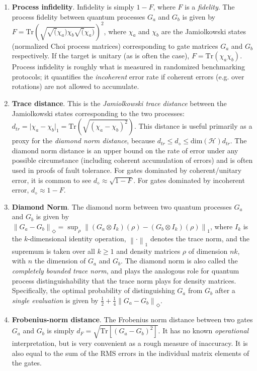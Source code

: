 \documentclass{article}[11pt]
\newcommand{\norm}[1]{\left\lVert#1\right\rVert}
\newcommand{\Tr}[0]{\mathrm{Tr}}
\begin{document}
\begin{enumerate}
\item \textbf{Process infidelity}.  Infidelity is simply $1-F$, where $F$ is a \emph{fidelity}.  The process fidelity between quantum processes $G_a$ and $G_b$ is given by $F = \Tr\left( \sqrt{ \sqrt(\chi_a) \chi_b \sqrt(\chi_a) } \right)^2$, where $\chi_a$ and $\chi_b$ are the Jamiolkowski states (normalized Choi process matrices) corresponding to gate matrices $G_a$ and $G_b$ respectively.  If the target is unitary (as is often the case), $F = \Tr\left( \chi_a \chi_b \right)$.  Process infidelity is roughly what is measured in randomized benchmarking protocols; it quantifies the \emph{incoherent} error rate if coherent errors (e.g. over rotations) are not allowed to accumulate.
\item \textbf{Trace distance}.  This is the \emph{Jamiolkowski trace distance} between the Jamiolkowski states corresponding to the two processes:  $d_{tr} = \vert\chi_a - \chi_b\vert_1 = \Tr\left(\sqrt{(\chi_a-\chi_b)^2}\right)$.  This distance is useful primarily as a proxy for the \emph{diamond norm distance}, because $d_{tr} \leq d_{\diamond} \leq \mathrm{dim}(\mathcal{H}) d_{tr}$.  The diamond norm distance is an upper bound on the rate of error under any possible circumstance (including coherent accumulation of errors) and is often used in proofs of fault tolerance.  For gates dominated by coherent/unitary error, it is common to see $d_{\diamond} \approx \sqrt{1-F}$.  For gates dominated by incoherent error, $d_{\diamond} \approx 1-F$.
\item \textbf{Diamond Norm}.  The diamond norm between two quantum processes $G_a$ and $G_b$ is given by $\norm{G_a - G_b}_\Diamond = \sup_\rho \norm{(G_a \otimes I_k)(\rho) - (G_b \otimes I_k)(\rho)}_1$, where $I_k$ is the $k$-dimensional identity operation, $\norm{\cdot}_1$ denotes the trace norm, and the supremum is taken over all $k \ge 1$ and density matrices $\rho$ of dimension $nk$, with $n$ the dimension of $G_a$ and $G_b$.  The diamond norm is also called the \emph{completely bounded trace norm}, and plays the analogous role for quantum process distinguishability that the trace norm plays for density matrices.  Specifically, the optimal probability of distinguishing $G_a$ from $G_b$ after a \emph{single evaluation} is given by $\frac{1}{2} + \frac{1}{4}\norm{G_a - G_b}_\Diamond$.
\item \textbf{Frobenius-norm distance}.  The Frobenius norm distance between two gates $G_a$ and $G_b$ is simply $d_F = \sqrt{\Tr\left[\left(G_a-G_b\right)^2\right]}$.  It has no known \emph{operational} interpretation, but is very convenient as a rough measure of inaccuracy.  It is also equal to the sum of the RMS errors in the individual matrix elements of the gates.
\end{enumerate}
\end{document}

